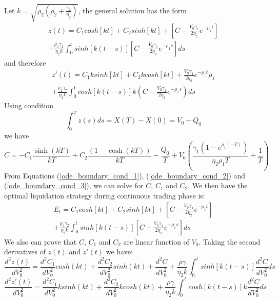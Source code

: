\documentclass{article}
\begin{document}
Let $k=\sqrt{\rho_2 \left(\rho_2 + \frac{\gamma_2}{\eta_2}\right)}$, the general solution has the form
\begin{equation}
  \begin{split}
    z(t) = C_1 cosh[k t]+ C_2  sinh[k t] + [C- \frac{V_0 \gamma_1}{2 \eta_2} e^{-\rho_1 t}] \\
    + \frac{\rho_2 \gamma_2}{\eta_2 k}\int_0^t sinh[k(t-s)] [C- \frac{V_0 \gamma_1}{2 \eta_2} e^{-\rho_1 s}]ds
  \end{split}
\end{equation}
and therefore
\begin{equation}
  \begin{split}
    z'(t) = C_1 k  sinh[k t]+ C_2 k cosh[k t] + \frac{V_0 \gamma_1}{2 \eta_2} e^{-\rho_1 t} \rho_1 \\
    + \frac{\rho_2 \gamma_2}{\eta_2 k}\int_0^t cosh[k(t-s)] k (C- \frac{V_0 \gamma_1}{2 \eta_2} e^{-\rho_1 s})ds
  \end{split}
\end{equation}
Using condition
\[
  \int_0^T z(s) ds = X(T) - X(0) = V_0 - Q_0
\]
we have
\begin{equation}\label{ode_boundary_cond_3}
  C = -C_1 \frac{ \sinh (k T)}{k T}+C_2 \frac{(1-\cosh (k T))}{k T}-\frac{Q_0}{T}+V_0 \left(\frac{\gamma_1 \left(1-e^{\rho_1 (-T)}\right)}{\eta_2 \rho_1
    T}+\frac{1}{T}\right)
\end{equation}
From Equations (\ref{ode_boundary_cond_1}), (\ref{ode_boundary_cond_2}) and (\ref{ode_boundary_cond_3}), we can solve for $C$, $C_1$ and $C_2$. We then have the optimal liquidation strategy during continuous trading phase is:
\[
  \begin{split}
    E_t = C_1 cosh[k t]+ C_2  sinh[k t] + [C- \frac{V_0 \gamma_1}{2 \eta_2} e^{-\rho_1 t}] \\
    + \frac{\rho_2 \gamma_2}{\eta_2 k}\int_0^t sinh[k(t-s)] [C- \frac{V_0 \gamma_1}{2 \eta_2} e^{-\rho_1 s}]ds
  \end{split}
\]
We also can prove that $C$, $C_1$ and $C_2$ are linear function of $V_0$. Taking the second derivatives of $z(t)$ and $z'(t)$ we have:
\[
  \frac{d^2z(t)}{dV_0^2} = \frac{d^2C_1}{dV_0^2} cosh(kt) + \frac{d^2C_2}{dV_0^2} sinh(kt) + \frac{d^2C}{dV_0^2} + \frac{\rho \gamma}{\eta_2 k}\int_0^t sinh[k(t-s)] \frac{d^2C}{dV_0^2} ds
\]
\[
  \frac{d^2z'(t)}{dV_0^2} = \frac{d^2C_1}{dV_0^2} k sinh(kt) + \frac{d^2C_2}{dV_0^2} k cosh(kt) + \frac{\rho \gamma}{\eta_2 k}\int_0^t cosh[k(t-s)] k \frac{d^2C}{dV_0^2} ds
\]
\end{document}
